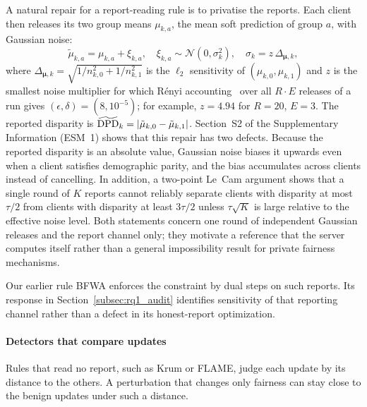 A natural repair for a report-reading rule is to privatise the reports. Each client then releases its two group means $\mu_{k,a}$, the mean soft prediction of group $a$, with Gaussian noise:
\begin{equation}
\label{eq:scalar_dp}
\tilde{\mu}_{k,a} = \mu_{k,a} + \xi_{k,a}, \quad \xi_{k,a} \sim \mathcal{N}\left(0, \sigma_k^2\right), \quad \sigma_k = z\,\Delta_{\bm{\mu},k},
\end{equation}
where $\Delta_{\bm{\mu},k} = \sqrt{1/n_{k,0}^2 + 1/n_{k,1}^2}$ is the $\ell_2$ sensitivity of $(\mu_{k,0}, \mu_{k,1})$ and $z$ is the smallest noise multiplier for which R\'enyi accounting~\citep{mironov2017renyi} over all $R \cdot E$ releases of a run gives $(\epsilon, \delta) = (8, 10^{-5})$; for example, $z = 4.94$ for $R = 20$, $E = 3$. The reported disparity is $\widetilde{\mathrm{DPD}}_k = |\tilde{\mu}_{k,0} - \tilde{\mu}_{k,1}|$. Section~S2 of the Supplementary Information (ESM~1) shows that this repair has two defects. Because the reported disparity is an absolute value, Gaussian noise biases it upwards even when a client satisfies demographic parity, and the bias accumulates across clients instead of cancelling. In addition, a two-point Le~Cam argument shows that a single round of $K$ reports cannot reliably separate clients with disparity at most $\tau/2$ from clients with disparity at least $3\tau/2$ unless $\tau\sqrt{K}$ is large relative to the effective noise level. Both statements concern one round of independent Gaussian releases and the report channel only; they motivate a reference that the server computes itself rather than a general impossibility result for private fairness mechanisms.

Our earlier rule BFWA enforces the constraint by dual steps on such reports. Its response in Section~\ref{subsec:rq1_audit} identifies sensitivity of that reporting channel rather than a defect in its honest-report optimization.

\paragraph{Detectors that compare updates}
\label{subsubsec:theory_subspace}

Rules that read no report, such as Krum or FLAME, judge each update by its distance to the others. A perturbation that changes only fairness can stay close to the benign updates under such a distance.

